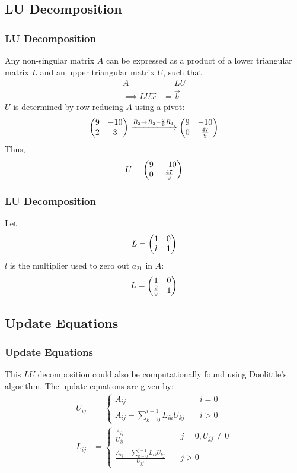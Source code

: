 \documentclass{beamer}
\begin{document}
\subsection{LU Decomposition}
\begin{frame}
\frametitle{LU Decomposition}
Any non-singular matrix $A$ can be expressed as a product of a lower triangular matrix $L$ and an upper triangular matrix $U$, such that
\begin{align}
    A &= LU\\
    \implies LU\vec{x} &= \vec{b}
\end{align}
$U$ is determined by row reducing $A$ using a pivot:
\begin{align}
    \begin{pmatrix}9 & -10\\2 & 3\end{pmatrix} \xrightarrow{R_2 \to R_2 - \frac{2}{9}R_1} \begin{pmatrix}9 & -10\\0 & \frac{47}{9}\end{pmatrix}
\end{align}
Thus,
\begin{align}
    U = \begin{pmatrix}9 & -10\\0 & \frac{47}{9}\end{pmatrix}
\end{align}
\end{frame}

\begin{frame}
\frametitle{LU Decomposition}
Let 
\begin{align}
    L = \begin{pmatrix}1 & 0\\l & 1\end{pmatrix}
\end{align}
$l$ is the multiplier used to zero out $a_{21}$ in $A$:
\begin{align}
    L = \begin{pmatrix}1 & 0\\ \frac{2}{9} & 1\end{pmatrix}
\end{align}
\end{frame}

\subsection{Update Equations}
\begin{frame}
\frametitle{Update Equations}
This $LU$ decomposition could also be computationally found using Doolittle's algorithm. The update equations are given by:
\begin{align}
    U_{ij} &= \begin{cases}
        A_{ij} & \quad i = 0\\
        A_{ij} - \sum_{k = 0}^{i - 1} L_{ik} U_{kj} & \quad i > 0
    \end{cases}\\
    L_{ij} &= \begin{cases}
        \frac{A_{ij}}{U_{jj}} & \quad j = 0, U_{jj} \neq 0\\
        \frac{A_{ij} - \sum_{k = 0}^{j - 1} L_{ik} U_{kj}}{U_{jj}} & \quad j > 0
    \end{cases}
\end{align}
\end{frame}
\end{document}
